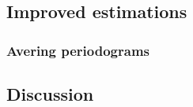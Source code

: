 \documentclass[a4paper,12pt]{article}
\begin{document}

\subsection{Improved estimations}


\subsubsection{Avering periodograms}


\subsection{Discussion}
\end{document}
